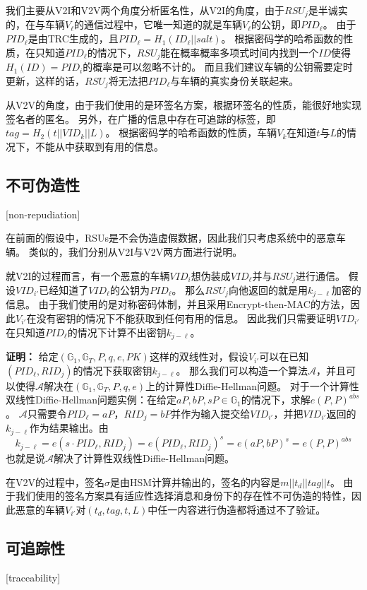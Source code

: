 我们主要从V2I和V2V两个角度分析匿名性，从V2I的角度，由于$RSU_j$是半诚实的，在与车辆$V_\ell$的通信过程中，它唯一知道的就是车辆$V_\ell$的公钥，即$PID_\ell$。
由于$PID_\ell$是由TRC生成的，且$PID_\ell=H_1(ID_\ell||salt)$。
根据密码学的哈希函数的性质，在只知道$PID_\ell$的情况下，$RSU_j$能在概率概率多项式时间内找到一个$ID$使得$H_1(ID)=PID_i$的概率是可以忽略不计的。
而且我们建议车辆的公钥需要定时更新，这样的话，$RSU_j$将无法把$PID_\ell$与车辆的真实身份关联起来。

从V2V的角度，由于我们使用的是环签名方案，根据环签名的性质，能很好地实现签名者的匿名。
另外，在广播的信息中存在可追踪的标签，即$tag=H_2(t||VID_k||L)$。
根据密码学的哈希函数的性质，车辆$V_k$在知道$t$与$L$的情况下，不能从中获取到有用的信息。

\subsection{不可伪造性}[non-repudiation]

在前面的假设中，RSUs是不会伪造虚假数据，因此我们只考虑系统中的恶意车辆。
类似的，我们分别从V2I与V2V两方面进行说明。

就V2I的过程而言，有一个恶意的车辆$VID_{i}$想伪装成$VID_\ell$并与$RSU_j$进行通信。
假设$VID_{i'}$已经知道了$VID_\ell$的公钥为$PID_\ell$。
那么$RSU_j$向他返回的就是用$k_{j-\ell}$加密的信息。
由于我们使用的是对称密码体制，并且采用Encrypt-then-MAC的方法，因此$V_{i'}$在没有密钥的情况下不能获取到任何有用的信息。
因此我们只需要证明$VID_{i'}$在只知道$PID_\ell$的情况下计算不出密钥$k_{j-\ell}$。

\textbf{证明：}  给定$(\mathbb{G}_1,\mathbb{G}_T,P,q,e,PK)$这样的双线性对，假设$V_{i'}$可以在已知$(PID_\ell,RID_j)$的情况下获取密钥$k_{j-\ell}$。
那么我们可以构造一个算法$\mathcal{A}$，并且可以使得$\mathcal{A}$解决在$(\mathbb{G}_1,\mathbb{G}_T,P,q,e)$上的计算性Diffie-Hellman问题。
对于一个计算性双线性Diffie-Hellman问题实例：在给定$aP,bP,sP\in\mathbb{G}_1$的情况下，求解$e(P,P)^{abs}$。
$\mathcal{A}$只需要令$PID_\ell=aP$，$RID_j=bP$并作为输入提交给$VID_{i'}$，并把$VID_{i'}$返回的$k_{j-\ell}$作为结果输出。由
$$k_{j-\ell}=e(s\cdot PID_\ell,RID_j)=e(PID_\ell,RID_j)^s=e(aP,bP)^s=e(P,P)^{abs}$$
也就是说$\mathcal{A}$解决了计算性双线性Diffie-Hellman问题。

在V2V的过程中，签名$\sigma$是由HSM计算并输出的，签名的内容是$m||t_d||tag||t$。
由于我们使用的签名方案具有适应性选择消息和身份下的存在性不可伪造的特性，因此恶意的车辆$V_{i'}$对$(t_d,tag,t,L)$中任一内容进行伪造都将通过不了验证。

\subsection{可追踪性}[traceability]

